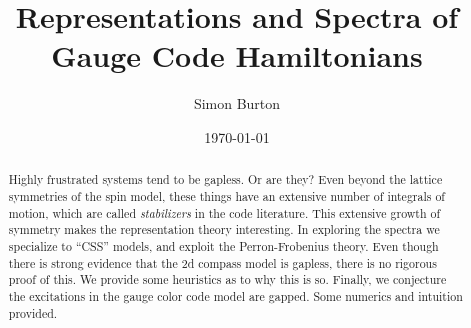 \documentclass[12pt]{article}
\begin{document}
\title{Representations and Spectra of Gauge Code Hamiltonians}

\author{Simon Burton}

\date{\today}


\maketitle

\begin{abstract}
Highly frustrated systems tend to be gapless. Or are they?
Even beyond the lattice symmetries of the spin model,
these things have an extensive number of integrals of motion, 
which are called \emph{stabilizers} in the code literature.
This extensive growth of symmetry
makes the representation theory interesting.
In exploring the spectra we specialize to ``CSS'' models,
and exploit the Perron-Frobenius theory.
Even though there is strong evidence that the 2d
compass model is gapless, 
there is no rigorous proof of this. We provide some
heuristics as to why this is so.
Finally, we conjecture the excitations in
the gauge color code model are gapped.
Some numerics and intuition provided.
\end{abstract}

\newpage
\tableofcontents
\newpage


\def\Complex{\mathbb{C}}
\def\C{\mathbb{C}}
\def\R{\mathbb{R}}
\def\Z{\mathbb{Z}}
\def\Ham{H} 
\def\Pauli{\mathcal{P}}
\def\Spec{\mbox{Spec}}
\def\Proveit{{\it (Proof??)}}
\def\GL{\mathrm{GL}}
\def\half{\frac{1}{2}}
\def\Stab{S}

\newcommand{\ket}[1]{|{#1}\rangle}
\newcommand{\expect}[1]{\langle{#1}\rangle}
\newcommand{\bra}[1]{\langle{#1}|}
\newcommand{\ketbra}[2]{\ket{#1}\!\bra{#2}}
\newcommand{\braket}[2]{\langle{#1}|{#2}\rangle}

\newcommand{\todo}[1]{\textcolor{red}{#1}}


%
%
\end{document}
